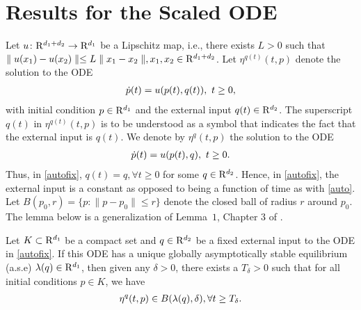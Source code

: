 \section{Results for the Scaled ODE}\label{oderes}
Let $u \colon\mathrm{R}^{d_1+d_2}\rightarrow\mathrm{R}^{d_1}$ be a Lipschitz map, i.e., there exists $L>0$ such that 
$\parallel u(x_1)-u(x_2)\parallel \leq L\parallel x_1-x_2\parallel, x_1,x_2\in \mathrm{R}^{d_1+d_2}$. 
Let $\eta^{q(t)}(t,p)$ denote the solution to the ODE
\begin{align}\label{auto}
\dot{p}(t)=u(p(t),q(t)), \mbox{ } t \geq 0,
\end{align}
with initial condition $p\in \mathrm{R}^{d_1}$ and the external input $q(t) \in \mathrm{R}^{d_2}$. The superscript $q(t)$ in $\eta^{q(t)}(t,p)$ is to be understood as a symbol that indicates the fact that the external input is $q(t)$. 
We denote by $\eta^q(t,p)$ the solution to the ODE
\begin{align}\label{autofix}
\dot{p}(t)=u(p(t),q), \mbox{ } t \geq 0.
\end{align}
Thus, in \eqref{autofix}, $q(t)=q, \forall t\geq 0$ for some $q\in \mathrm{R}^{d_2}$. Hence, in \eqref{autofix},
the external input is a constant as opposed to being a function of time as with \eqref{auto}.
Let $B(p_0,r)=\{p\colon \parallel p-p_0\parallel \leq r\}$ denote the closed ball of radius $r$ 
around $p_0$. The 
lemma below is a generalization of Lemma~$1$, Chapter $3$ of \cite{SA}.
\begin{lemma}\label{attract}
Let $K\subset \mathrm{R}^{d_1}$ be a compact set and $q\in \mathrm{R}^{d_2}$ be a fixed external input to the ODE in 
\eqref{autofix}. If this ODE has a unique globally asymptotically stable equilibrium (a.s.e) 
$\lambda(q) \in \mathrm{R}^{d_1}$, then given any $\delta>0$, there exists a $T_\delta>0$ such that for all 
initial conditions $p \in K$, we have
\begin{align}
 \eta^q(t,p) \in B(\lambda(q),\delta), \forall t\geq T_\delta.\nonumber
\end{align}
\end{lemma}

